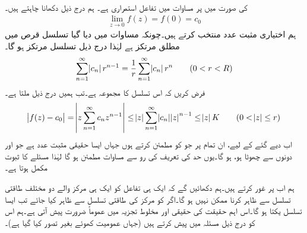\quad {}\\
 کی صورت میں  پر  مساوات  میں تفاعل   استمراری ہے۔
\quad
ہم درج ذیل دکھانا چاہتے ہیں۔
\begin{align}\label{مساوات_ٹیلر_طاقتی_تسلسل_اور_تحلیلی_تفاعل_ب}
\lim_{z\to 0} f(z)=f(0)=c_0
\end{align}
ہم اختیاری مثبت عدد  منتخب کرتے ہیں۔چونکہ مساوات  میں دیا گیا تسلسل  قرص  میں مطلق مرتکز ہے لہٰذا درج ذیل تسلسل مرتکز ہو گا۔
\begin{align*}
\sum\limits_{n=1}^{\infty}\abs{c_n}r^{n-1}=\frac{1}{r}\sum\limits_{n=1}^{\infty} \abs{c_n}r^n\quad \quad (0<r<R)
\end{align*}
فرض کریں کہ اس تسلسل کا مجموعہ  ہے۔تب ہمیں درج ذیل ملتا ہے۔
\begin{align*}
\abs{f(z)-c_0}=\abs{z\sum\limits_{n=1}^{\infty} c_n z^{n-1}}\le \abs{z}\sum\limits_{n=1}^{\infty}\abs{c_n}\abs{z}^{n-1}\le \abs{z}K\quad \quad (0<\abs{z}\le r)
\end{align*}
اب دیے گئے   کے لیے، ان تمام  پر جو  کو مطمئن کرتے ہوں جہاں  ایسا حقیقی مثبت عدد ہے جو  اور  دونوں سے چھوٹا ہو،   ہو گا۔یوں حد کی تعریف کی رو سے مساوات  مطمئن ہو گا لہٰذا مسئلے کا ثبوت مکمل ہوتا ہے۔ 

ہم اب  پر غور کرتے ہیں۔ہم دکھائیں گے کہ ایک ہی تفاعل  کو ایک ہی مرکز والے دو مختلف طاقتی تسلسل سے ظاہر کرنا ممکن نہیں ہو گا۔اگر  کو مرکز  کی طاقتی تسلسل سے ظاہر کیا جائے تب ایسا تسلسل یکتا ہو گا۔اس اہم حقیقت کی حقیقی اور مخلوط تجزیہ میں عموماً ضرورت پیش آتی ہے۔ہم اس کو درج ذیل مسئلہ میں پیش کرتے ہیں (جہاں عمومیت کھوئے بغیر  تصور کیا گیا ہے)۔ 

